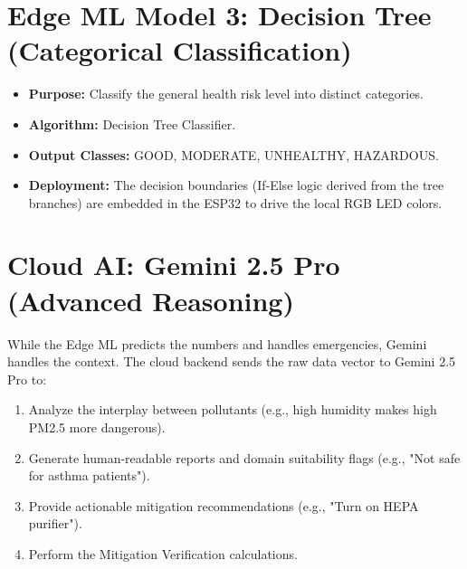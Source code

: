 \documentclass[12pt,a4paper]{report}
\begin{document}
\section{Edge ML Model 3: Decision Tree (Categorical Classification)}
\begin{itemize}
    \item \textbf{Purpose:} Classify the general health risk level into distinct categories.
    \item \textbf{Algorithm:} Decision Tree Classifier.
    \item \textbf{Output Classes:} GOOD, MODERATE, UNHEALTHY, HAZARDOUS.
    \item \textbf{Deployment:} The decision boundaries (If-Else logic derived from the tree branches) are embedded in the ESP32 to drive the local RGB LED colors.
\end{itemize}

\section{Cloud AI: Gemini 2.5 Pro (Advanced Reasoning)}
While the Edge ML predicts the numbers and handles emergencies, Gemini handles the context. The cloud backend sends the raw data vector to Gemini 2.5 Pro to:
\begin{enumerate}
    \item Analyze the interplay between pollutants (e.g., high humidity makes high PM2.5 more dangerous).
    \item Generate human-readable reports and domain suitability flags (e.g., "Not safe for asthma patients").
    \item Provide actionable mitigation recommendations (e.g., "Turn on HEPA purifier").
    \item Perform the Mitigation Verification calculations.
\end{enumerate}

\end{document}

